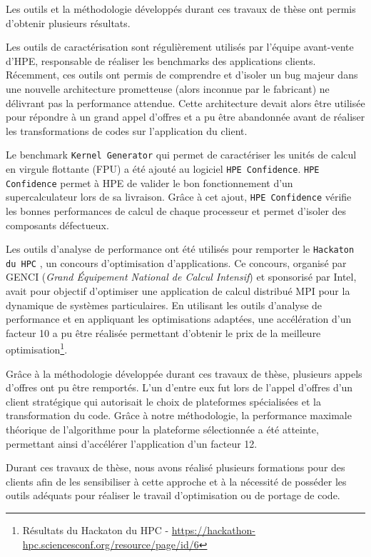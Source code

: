         Les outils et la méthodologie développés durant ces travaux de thèse ont permis d'obtenir plusieurs résultats.
        
        Les outils de caractérisation sont régulièrement utilisés par l'équipe avant-vente d'HPE, responsable de réaliser les benchmarks des applications clients. Récemment, ces outils ont permis de comprendre et d’isoler un bug majeur dans une nouvelle architecture prometteuse (alors inconnue par le fabricant) ne délivrant pas la performance attendue. Cette architecture devait alors être utilisée pour répondre à un grand appel d'offres et a pu être abandonnée avant de réaliser les transformations de codes sur l'application du client.
        
        Le benchmark \verb|Kernel Generator| qui permet de caractériser les unités de calcul en virgule flottante (\gls{FPU}) a été ajouté au logiciel \verb|HPE Confidence|. \verb|HPE Confidence| permet à HPE de valider le bon fonctionnement d'un supercalculateur lors de sa livraison. Grâce à cet ajout, \verb|HPE Confidence| vérifie les bonnes performances de calcul de chaque processeur et permet d’isoler des composants défectueux. 

        Les outils d'analyse de performance ont été utilisés pour remporter le \verb|Hackaton du HPC| \cite{Hackaton}, un concours d’optimisation d’applications. Ce concours, organisé par GENCI (\textit{Grand Équipement National de Calcul Intensif}) et sponsorisé par Intel, avait pour objectif d’optimiser une application de calcul distribué MPI pour la dynamique de systèmes particulaires. En utilisant les outils d'analyse de performance et en appliquant les optimisations adaptées, une accélération d’un facteur 10 a pu être réalisée permettant d'obtenir le prix de la meilleure optimisation\footnote{Résultats du Hackaton du HPC - \url{https://hackathon-hpc.sciencesconf.org/resource/page/id/6}}.
        
        Grâce à la méthodologie développée durant ces travaux de thèse, plusieurs appels d'offres ont pu être remportés. L’un d’entre eux fut lors de l’appel d’offres d’un client stratégique qui autorisait le choix de plateformes spécialisées et la transformation du code. Grâce à notre méthodologie, la performance maximale théorique de l’algorithme pour la plateforme sélectionnée a été atteinte, permettant ainsi d'accélérer l'application d'un facteur 12. 
        
        Durant ces travaux de thèse, nous avons réalisé plusieurs formations pour des clients afin de les sensibiliser à cette approche et à la nécessité de posséder les outils adéquats pour réaliser le travail d’optimisation ou de portage de code.

